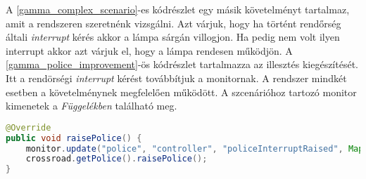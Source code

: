 A \ref{gamma_complex_scenario}-es kódrészlet egy másik követelményt tartalmaz, amit a rendszeren szeretnénk vizsgálni.
Azt várjuk, hogy ha történt rendőrség általi \textit{interrupt} kérés akkor a lámpa sárgán villogjon.
Ha pedig nem volt ilyen interrupt akkor azt várjuk el, hogy a lámpa rendesen működjön.
A \ref{gamma_police_improvement}-ös kódrészlet tartalmazza az illesztés kiegészítését.
Itt a rendörségi \textit{interrupt} kérést továbbítjuk a monitornak.
A rendszer mindkét esetben a követelménynek megfelelően működött.
A szcenárióhoz tartozó monitor kimenetek a \textit{Függelékben} található meg.

\begin{lstlisting}[language=java, frame=single, float=ht!, caption={Gamma illesztéshez tartozó kódrészlet.},captionpos=b,label=gamma_police_improvement]
@Override
public void raisePolice() {
    monitor.update("police", "controller", "policeInterruptRaised", Map.of("success", true));
    crossroad.getPolice().raisePolice();
}
\end{lstlisting}